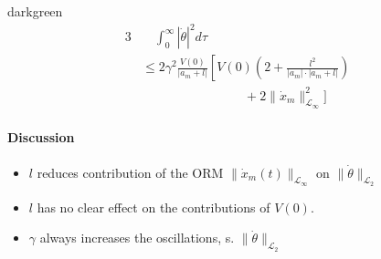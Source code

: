 \begin{conclusion}{darkgreen}
\begin{alignat*}{3}
    & \quad  \int_0^\infty |\dot{\theta}|^2 d\tau  \\
&\leq 2\gamma^2 \frac{V(0)}{|a_m+l|}
    \left[ V(0) \left( 2 + \frac{l^2}{|a_m| \cdot |a_m + l|} \right) \right. \\
         & \qquad \qquad \qquad \qquad 
         + 2 \| \dot{x}_m \|^2_{\mathcal{L}_\infty} \biggr]
\end{alignat*}
\end{conclusion}

\paragraph{Discussion}
\begin{itemize}
\item $l$ reduces contribution of the ORM
    $\| \dot{x}_m(t) \|_{\mathcal{L}_\infty}$ on $\| \dot{\theta} \|_{\mathcal{L}_2}$ 
\item $l$ has no clear effect on the contributions of $V(0)$.
\item $\gamma$ always increases the oscillations, s.
    $\| \dot{\theta} \|_{\mathcal{L}_2}$
\end{itemize}




